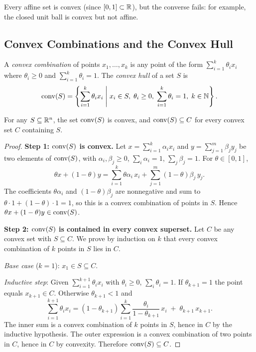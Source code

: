 \documentclass[11pt,a4paper]{article}
\begin{document}
\begin{remark}
Every affine set is convex (since $[0,1] \subset \mathbb{R}$), but the converse fails:
for example, the closed unit ball is convex but not affine.
\end{remark}

\subsection{Convex Combinations and the Convex Hull}

\begin{definition}
\label{def:convex-hull}
A \emph{convex combination} of points $x_1, \ldots, x_k$ is any point of the
form $\sum_{i=1}^k \theta_i x_i$ where $\theta_i \ge 0$ and $\sum_{i=1}^k
\theta_i = 1$.  The \emph{convex hull} of a set $S$ is
\[
  \operatorname{conv}(S) = \left\{ \sum_{i=1}^k \theta_i x_i \;\middle|\;
    x_i \in S,\; \theta_i \ge 0,\;
    \sum_{i=1}^k \theta_i = 1,\; k \in \mathbb{N} \right\}.
\]
\end{definition}

\begin{proposition}
\label{prop:convex-hull-smallest}
For any $S \subseteq \mathbb{R}^n$, the set $\operatorname{conv}(S)$ is convex, and $\operatorname{conv}(S)
\subseteq C$ for every convex set $C$ containing $S$.
\end{proposition}

\begin{proof}
\textbf{Step 1: $\operatorname{conv}(S)$ is convex.}
Let $x = \sum_{i=1}^k \alpha_i x_i$ and $y = \sum_{j=1}^m \beta_j y_j$ be
two elements of $\operatorname{conv}(S)$, with $\alpha_i, \beta_j \ge 0$,
$\sum_i \alpha_i = 1$, $\sum_j \beta_j = 1$.  For $\theta \in [0,1]$,
\[
  \theta x + (1-\theta) y
  = \sum_{i=1}^k \theta \alpha_i\, x_i
    + \sum_{j=1}^m (1-\theta) \beta_j\, y_j.
\]
The coefficients $\theta \alpha_i$ and $(1-\theta)\beta_j$ are nonnegative and
sum to $\theta \cdot 1 + (1-\theta) \cdot 1 = 1$, so this is a convex
combination of points in $S$.  Hence $\theta x + (1-\theta) y \in \operatorname{conv}(S)$.

\textbf{Step 2: $\operatorname{conv}(S)$ is contained in every convex superset.}
Let $C$ be any convex set with $S \subseteq C$.  We prove by induction on $k$
that every convex combination of $k$ points in $S$ lies in $C$.

\emph{Base case} ($k = 1$): $x_1 \in S \subseteq C$.

\emph{Inductive step}: Given $\sum_{i=1}^{k+1} \theta_i x_i$ with
$\theta_i \ge 0$, $\sum_i \theta_i = 1$.  If $\theta_{k+1} = 1$ the point
equals $x_{k+1} \in C$.  Otherwise $\theta_{k+1} < 1$ and
\[
  \sum_{i=1}^{k+1} \theta_i x_i
  = (1 - \theta_{k+1}) \sum_{i=1}^k
    \frac{\theta_i}{1-\theta_{k+1}}\, x_i
    \;+\; \theta_{k+1}\, x_{k+1}.
\]
The inner sum is a convex combination of $k$ points in $S$, hence in $C$ by
the inductive hypothesis.  The outer expression is a convex combination of
two points in $C$, hence in $C$ by convexity.  Therefore $\operatorname{conv}(S) \subseteq C$.
\end{proof}
\end{document}

